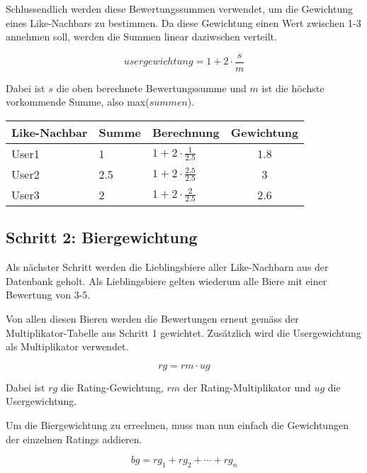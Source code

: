 \documentclass[10pt,a4paper]{scrartcl}
\begin{document}
\vspace{5mm}

Schlussendlich werden diese Bewertungssummen verwendet, um die Gewichtung eines Like-Nachbars zu bestimmen.
Da diese Gewichtung einen Wert zwischen 1-3 annehmen soll, werden die Summen linear daziwschen verteilt.

$$usergewichtung = 1 + 2 \cdot \frac{s}{m}$$

Dabei ist $s$ die oben berechnete Bewertungssumme und $m$ ist die höchste vorkommende Summe, also max($summen$).

\begin{tabular}{lllc}
	\toprule
	Like-Nachbar & Summe & Berechnung & Gewichtung \\
	\midrule
	User1 & 1   & $1 + 2 \cdot \frac{1}{2.5}$   & 1.8 \\
	User2 & 2.5 & $1 + 2 \cdot \frac{2.5}{2.5}$ & 3   \\
	User3 & 2   & $1 + 2 \cdot \frac{2}{2.5}$   & 2.6 \\
	\bottomrule
\end{tabular}


\subsection{Schritt 2: Biergewichtung}

Als nächster Schritt werden die Lieblingsbiere aller Like-Nachbarn aus der Datenbank geholt. Als
Lieblingsbiere gelten wiederum alle Biere mit einer Bewertung von 3-5.

Von allen diesen Bieren werden die Bewertungen erneut gemäss der Multiplikator-Tabelle aus Schritt
1 gewichtet. Zusätzlich wird die Usergewichtung als Multiplikator verwendet.

$$rg = rm \cdot ug$$

Dabei ist $rg$ die Rating-Gewichtung, $rm$ der Rating-Multiplikator und $ug$ die Usergewichtung.

Um die Biergewichtung zu errechnen, muss man nun einfach die Gewichtungen der einzelnen Ratings
addieren.

$$bg = rg_1 + rg_2 + \cdots + rg_n$$
\end{document}
